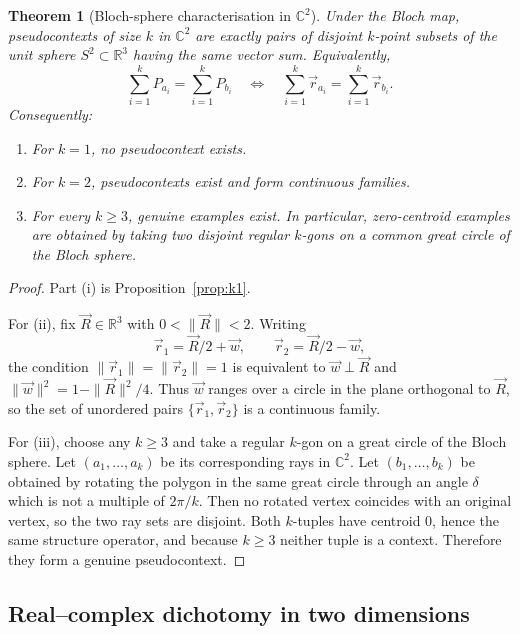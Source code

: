 \documentclass[
  twocolumn,
  aps,
  pra,
  floatfix,
  amsmath,amssymb,
  longbibliography
]{revtex4-2}
\newtheorem{theorem}{Theorem}
\theoremstyle{definition}
\theoremstyle{remark}
\begin{document}
\begin{theorem}[Bloch-sphere characterisation in \(\mathbb C^2\)]
\label{thm:d2_complex}
Under the Bloch map, pseudocontexts of size \(k\) in \(\mathbb C^2\) are exactly pairs of disjoint \(k\)-point subsets of the unit sphere \(S^2\subset\mathbb R^3\) having the same vector sum. Equivalently,
\[
\sum_{i=1}^k P_{a_i}=\sum_{i=1}^k P_{b_i}
\quad\Longleftrightarrow\quad
\sum_{i=1}^k \vec r_{a_i}=\sum_{i=1}^k \vec r_{b_i}.
\]
Consequently:
\begin{enumerate}
\item[(i)] For $k=1$, no pseudocontext exists.
\item[(ii)] For $k=2$, pseudocontexts exist and form continuous families.
\item[(iii)] For every \(k\ge3\), genuine examples exist. In particular, zero-centroid examples are obtained by taking two disjoint regular \(k\)-gons on a common great circle of the Bloch sphere.
\end{enumerate}
\end{theorem}

\begin{proof}
Part (i) is Proposition~\ref{prop:k1}.

For (ii), fix $\vec{R}\in\mathbb{R}^3$ with $0<\|\vec{R}\|<2$.  Writing
\[
  \vec{r}_1=\vec{R}/2+\vec{w},\qquad
  \vec{r}_2=\vec{R}/2-\vec{w},
\]
the condition $\|\vec{r}_1\|=\|\vec{r}_2\|=1$ is equivalent to
$\vec{w}\perp\vec{R}$ and $\|\vec{w}\|^2=1-\|\vec{R}\|^2/4$.
Thus $\vec{w}$ ranges over a circle in the plane orthogonal to $\vec{R}$,
so the set of unordered pairs $\{\vec{r}_1,\vec{r}_2\}$ is a continuous
family.

For (iii), choose any $k\ge 3$ and take a regular $k$-gon on a great
circle of the Bloch sphere.  Let $(a_1,\ldots,a_k)$ be its
corresponding rays in $\mathbb{C}^2$.  Let $(b_1,\ldots,b_k)$ be
obtained by rotating the polygon in the same great circle through an
angle $\delta$ which is not a multiple of $2\pi/k$.  Then no rotated
vertex coincides with an original vertex, so the two ray sets are
disjoint.  Both $k$-tuples have centroid $0$, hence the same structure
operator, and because $k\ge 3$ neither tuple is a context. Therefore
they form a genuine pseudocontext.
\end{proof}


\subsection{Real--complex dichotomy in two dimensions}
\end{document}
